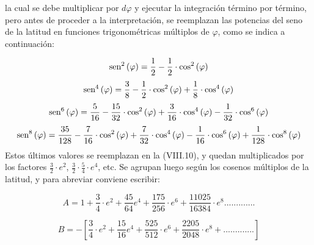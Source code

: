 \documentclass{tufte-book}
\newcommand\normalsubformula[1]{\text{\mathversion{normal}$#1$}}
\begin{document}
la cual se debe multiplicar por  ${\mathit{d\varphi }}$ y ejecutar la
integración término por término, pero antes de proceder a la
interpretación, se reemplazan las potencias del seno de la latitud en
funciones trigonométricas múltiplos de  ${\varphi }$, como se
indica a continuación:

\begin{equation*}
{\normalsubformula{\text{sen}}^{{2}}\left(\varphi
\right)=\frac{1}{2}-\frac{1}{2}\cdot \text{cos}^{{2}}\left(\varphi
\right)}
\end{equation*}
\begin{equation*}
{\normalsubformula{\text{sen}}^{{4}}\left(\varphi
\right)=\frac{3}{8}-\frac{1}{2}\cdot \text{cos}^{{2}}\left(\varphi
\right)+\frac{1}{8}\cdot \text{cos}^{{4}}\left(\varphi \right)}
\end{equation*}
\begin{equation*}
{\normalsubformula{\text{sen}}^{{6}}\left(\varphi
\right)=\frac{5}{\text{16}}-\frac{\text{15}}{\text{32}}\cdot
\text{cos}^{{2}}\left(\varphi \right)+\frac{3}{\text{16}}\cdot
\text{cos}^{{4}}\left(\varphi \right)-\frac{1}{\text{32}}\cdot
\text{cos}^{{6}}\left(\varphi \right)}
\end{equation*}
\begin{equation*}
{\normalsubformula{\text{sen}}^{{8}}\left(\varphi
\right)=\frac{\text{35}}{\text{128}}-\frac{7}{\text{16}}\cdot
\text{cos}^{{2}}\left(\varphi \right)+\frac{7}{\text{32}}\cdot
\text{cos}^{{4}}\left(\varphi \right)-\frac{1}{\text{16}}\cdot
\text{cos}^{{6}}\left(\varphi \right)+\frac{1}{\text{128}}\cdot
\text{cos}^{{8}}\left(\varphi \right)}
\end{equation*}
Estos últimos valores se reemplazan en la (VIII.10), y quedan
multiplicados por los factores  ${\frac{3}{2}\cdot e^{{2}}}$, 
${\frac{3}{2}\cdot {\frac{5}{4}}\cdot e^{{4}}}$, etc. Se agrupan luego
según los cosenos múltiplos de la latitud, y para abreviar conviene
escribir:

\begin{equation*}
{A=1+\frac{3}{4}\cdot
e^{{2}}+\frac{\text{45}}{\text{64}}e^{{4}}+\frac{\text{175}}{\text{256}}\cdot
e^{{6}}+\frac{\text{11025}}{\text{16384}}\cdot
e^{{8}}\text{.}\text{.}\text{.}\text{.}\text{.}\text{.}\text{.}\text{.}\text{.}\text{.}\text{.}\text{.}\text{.}}
\end{equation*}

\begin{equation*}
{B=-\left[\frac{3}{4}\cdot
e^{{2}}+\frac{\text{15}}{\text{16}}e^{{4}}+\frac{\text{525}}{\text{512}}\cdot
e^{{6}}+\frac{\text{2205}}{\text{2048}}\cdot
e^{{8}}+\text{.}\text{.}\text{.}\text{.}\text{.}\text{.}\text{.}\text{.}\text{.}\text{.}\text{.}\text{.}\text{.}\right]}
\end{equation*}
\end{document}
